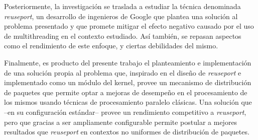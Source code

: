 Posteriormente, la investigación se traslada a estudiar la técnica denominada \emph{reuseport}, un desarrollo de ingenieros de Google que plantea una solución al problema presentado y que promete mitigar el efecto negativo causado por el uso de multithreading en el contexto estudiado. Así también, se repasan aspectos como el rendimiento de este enfoque, y ciertas debilidades del mismo. 

Finalmente, es producto del presente trabajo el planteamiento e implementación de una solución propia al problema que, inspirado en el diseño de \emph{reuseport} e implementado como un módulo del kernel, provee un mecanismo de distribución de paquetes que permite optar a mejoras de desempeño en el procesamiento de los mismos usando técnicas de procesamiento paralelo clásicas. Una solución que --en su configuración estándar-- provee un rendimiento competitivo a \emph{reuseport}, pero que gracias a ser ampliamente configurable permite postular a mejores resultados que \emph{reuseport} en contextos no uniformes de distribución de paquetes.

